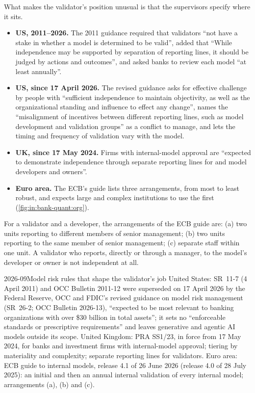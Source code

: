 What makes the validator's position unusual is that the supervisors specify where it sits.
\begin{itemize}
\item \textbf{US, 2011--2026.} The 2011 guidance required that validators ``not have a stake in whether a model is
determined to be valid'', added that ``While independence may be supported by separation of reporting lines, it should be
judged by actions and outcomes'', and asked banks to review each model ``at least annually''.
\item \textbf{US, since 17 April 2026.} The revised guidance asks for effective challenge by people with ``sufficient
independence to maintain objectivity, as well as the organizational standing and influence to effect any change'', names
the ``misalignment of incentives between different reporting lines, such as model development and validation groups'' as
a conflict to manage, and lets the timing and frequency of validation vary with the model.
\item \textbf{UK, since 17 May 2024.} Firms with internal-model approval are ``expected to demonstrate independence
through separate reporting lines for  and model developers and owners''.
\item \textbf{Euro area.} The ECB's guide lists three arrangements, from most to least robust, and expects large and
complex institutions to use the first (\cref{fig:in:bank-quant:org}).
\end{itemize}

\begin{definition}\label{def:in:bank-quant:arrangement}
For a validator and a developer, the arrangements of the ECB guide are: (a) two units reporting to different members of
senior management; (b) two units reporting to the same member of senior management; (c) separate staff within one unit.
A validator who reports, directly or through a manager, to the model's developer or owner is not independent at all.
\end{definition}

\begin{dated}{2026-09}{Model risk rules that shape the validator's job}\label{dat:in:bank-quant:rules}
United States: SR~11-7 (4 April 2011) and OCC Bulletin 2011-12 were superseded on 17 April 2026 by the Federal Reserve,
OCC and FDIC's revised guidance on model risk management (SR~26-2; OCC Bulletin 2026-13), ``expected to be most relevant
to banking organizations with over \$30 billion in total assets''; it sets no ``enforceable standards or prescriptive
requirements'' and leaves generative and agentic AI models outside its scope. United Kingdom: PRA SS1/23, in force from
17 May 2024, for banks and investment firms with internal-model approval; tiering by materiality and complexity; separate
reporting lines for validators. Euro area: ECB guide to internal models, release 4.1 of 26 June 2026 (release 4.0 of 28
July 2025): an initial and then an annual internal validation of every internal model; arrangements (a), (b) and (c).
\end{dated}

